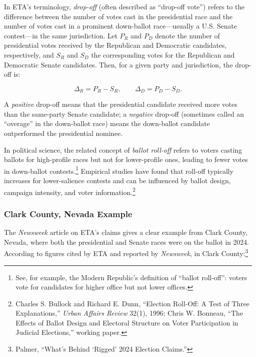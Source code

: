 \documentclass[12pt]{article}
\begin{document}
In ETA's terminology, \emph{drop-off} (often described as ``drop-off vote'') refers to the difference between the number of votes cast in the presidential race and the number of votes cast in a prominent down-ballot race---usually a U.S. Senate contest---in the same jurisdiction. Let $P_{R}$ and $P_{D}$ denote the number of presidential votes received by the Republican and Democratic candidates, respectively, and $S_{R}$ and $S_{D}$ the corresponding votes for the Republican and Democratic Senate candidates. Then, for a given party and jurisdiction, the drop-off is:

\begin{equation}
    \Delta_R = P_R - S_R, \qquad \Delta_D = P_D - S_D.
\end{equation}

A \emph{positive} drop-off means that the presidential candidate received more votes than the same-party Senate candidate; a \emph{negative} drop-off (sometimes called an \enquote{overage} in the down-ballot race) means the down-ballot candidate outperformed the presidential nominee.

In political science, the related concept of \emph{ballot roll-off} refers to voters casting ballots for high-profile races but not for lower-profile ones, leading to fewer votes in down-ballot contests.\footnote{See, for example, the Modern Republic's definition of \enquote{ballot roll-off}: voters vote for candidates for higher office but not lower offices.} Empirical studies have found that roll-off typically increases for lower-salience contests and can be influenced by ballot design, campaign intensity, and voter information.\footnote{Charles S. Bullock and Richard E. Dunn, ``Election Roll-Off: A Test of Three Explanations,'' \emph{Urban Affairs Review} 32(1), 1996; Chris W. Bonneau, ``The Effects of Ballot Design and Electoral Structure on Voter Participation in Judicial Elections,'' working paper.}

\subsubsection{Clark County, Nevada Example}

The \emph{Newsweek} article on ETA's claims gives a clear example from Clark County, Nevada, where both the presidential and Senate races were on the ballot in 2024. According to figures cited by ETA and reported by \emph{Newsweek}, in Clark County:\footnote{Palmer, ``What's Behind `Rigged' 2024 Election Claims.''}
\end{document}
